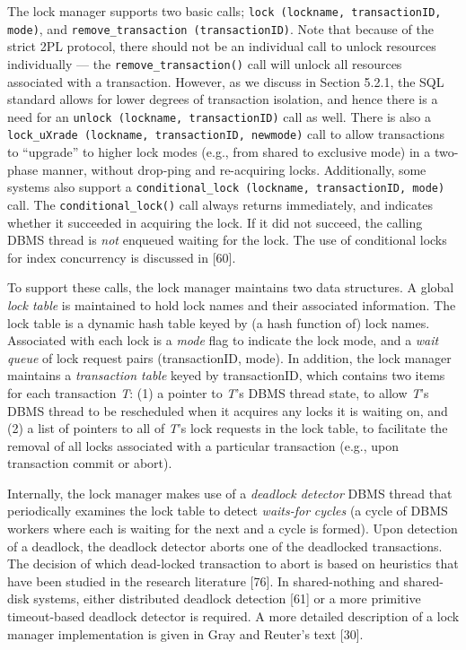 \documentclass[b5paper,11pt,twoside,openright]{book}
\begin{document}
The lock manager supports two basic calls; \texttt{lock (lockname,
transactionID, mode)}, and \texttt{remove\_transaction (transactionID)}. Note that
because of the strict 2PL protocol, there should not be an individual
call to unlock resources individually --- the \texttt{remove\_transaction()} call
will unlock all resources associated with a transaction. However, as we
discuss in Section 5.2.1, the SQL standard allows for lower degrees of
transaction isolation, and hence there is a need for an \texttt{unlock
(lockname, transactionID)} call as well. There is also a \texttt{lock\_uXrade
(lockname, transactionID, newmode)} call to allow transactions to
``upgrade'' to higher lock modes (e.g., from shared to exclusive mode)
in a two-phase manner, without drop-ping and re-acquiring locks.
Additionally, some systems also support a \texttt{conditional\_lock (lockname,
transactionID, mode)} call. The \texttt{conditional\_lock()} call always returns
immediately, and indicates whether it succeeded in acquiring the lock.
If it did not succeed, the calling DBMS thread is \emph{not} enqueued
waiting for the lock. The use of conditional locks for index concurrency
is discussed in {[}60{]}.

To support these calls, the lock manager maintains two data structures.
A global \emph{lock table} is maintained to hold lock names and their
associated information. The lock table is a dynamic hash table keyed by
(a hash function of) lock names. Associated with each lock is a
\emph{mode} flag to indicate the lock mode, and a \emph{wait queue} of
lock request pairs (transactionID, mode). In addition, the lock manager
maintains a \emph{transaction table} keyed by transactionID, which
contains two items for each transaction \emph{T}: (1) a pointer to
\emph{T}'s DBMS thread state, to allow \emph{T}'s DBMS thread to be
rescheduled when it acquires any locks it is waiting on, and (2) a list
of pointers to all of \emph{T}'s lock requests in the lock table, to
facilitate the removal of all locks associated with a particular
transaction (e.g., upon transaction commit or abort).

Internally, the lock manager makes use of a \emph{deadlock detector}
DBMS thread that periodically examines the lock table to detect
\emph{waits-for} \emph{cycles} (a cycle of DBMS workers where each is
waiting for the next and a cycle is formed). Upon detection of a
deadlock, the deadlock detector aborts one of the deadlocked
transactions. The decision of which dead-locked transaction to abort is
based on heuristics that have been studied in the research literature
{[}76{]}. In shared-nothing and shared-disk systems, either distributed
deadlock detection {[}61{]} or a more primitive timeout-based deadlock
detector is required. A more detailed description of a lock manager
implementation is given in Gray and Reuter's text {[}30{]}.
\end{document}
